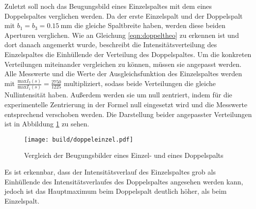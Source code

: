 Zuletzt soll noch das Beugungsbild eines Einzelspaltes mit dem eines Doppelspaltes
verglichen werden. Da der erste Einzelspalt und der Doppelspalt mit $b_1 = b_3 = \SI{0.15}{\milli\meter}$
die gleiche Spaltbreite haben, werden diese beiden Aperturen verglichen.
Wie an Gleichung \eqref{eqn:doppeltheo} zu erkennen ist und dort danach angemerkt
wurde, beschreibt die Intensitätsverteilung des Einzelspaltes die Einhüllende
der Verteilung des Doppelspaltes. Um die konkreten Verteilungen miteinander vergleichen
zu können, müssen sie angepasst werden. Alle Messwerte und die Werte der Ausgleichsfunktion
des Einzelspaltes werden mit $\frac{\text{max} I_3(s)}{\text{max} I_1(s)} = \frac{2750}{1225}$
multipliziert, sodass beide Verteilungen die gleiche Nullintensität haben. Außerdem
werden sie um null zentriert, indem für die experimentelle Zentrierung in der Formel
null eingesetzt wird und die Messwerte entsprechend verschoben werden.
Die Darstellung beider angepasster Verteilungen ist in Abbildung \ref{fig:doppeleinzel}
zu sehen.

\begin{figure}
  \centering
  \texttt{[image: build/doppeleinzel.pdf]}
  \caption{Vergleich der Beugungsbilder eines Einzel- und eines Doppelspalts}
  \label{fig:doppeleinzel}
\end{figure}

Es ist erkennbar, dass der Intensitätsverlauf des Einzelspaltes grob als Einhüllende
des Intensitätsverlaufes des Doppelspaltes angesehen werden kann, jedoch ist das Hauptmaximum
beim Doppelspalt deutlich höher, als beim Einzelspalt.
